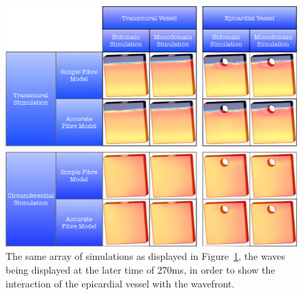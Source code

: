     \begin{figure}[htbp]
  		\centering
  	    \includegraphics[width=1\textwidth]{Ch4/Figs/planar_propagation_2}
              \caption{The same array of simulations as displayed in Figure~\ref{fig:planar_propagation_2}, the waves being displayed at the later time of 270ms, in order to show the interaction of the epicardial vessel with the wavefront.}
  	  \label{fig:planar_propagation_2}
  	\end{figure}


